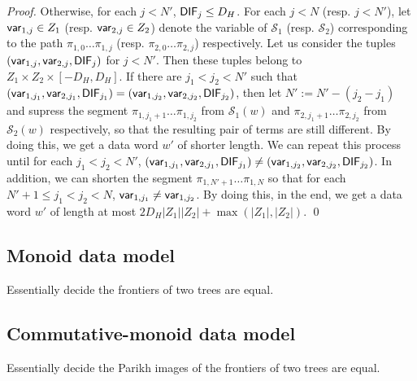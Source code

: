 \documentclass[runningheads,a4paper]{llncs}
\newcommand\Ss{\mathcal{S}}
\begin{document}
\begin{proof}
Otherwise, for each $j < N'$,  ${\sf DIF}_j \le D_H$. For each $j < N$ (resp. $j < N'$), let ${\sf var}_{1,j} \in Z_1$ (resp. ${\sf var}_{2,j} \in Z_2$) denote the variable of $\Ss_1$ (resp. $\Ss_2$) corresponding to the path $\pi_{1,0} \dots \pi_{1,j}$ (resp. $\pi_{2,0} \dots \pi_{2,j}$) respectively. Let us consider the tuples $({\sf var}_{1,j}, {\sf var}_{2,j}, {\sf DIF}_j)$ for $j < N'$. Then these tuples belong to $Z_1 \times Z_2 \times [-D_H, D_H]$. If there are $j_1 < j_2 < N'$ such that $({\sf var}_{1, j_1}, {\sf var}_{2, j_1}, {\sf DIF}_{j_1}) = ({\sf var}_{1, j_2}, {\sf var}_{2, j_2}, {\sf DIF}_{j_2})$, then let $N':= N' - (j_2 - j_1)$ and supress the segment $\pi_{1, j_1+1} \dots \pi_{1,j_2}$ from $\Ss_1(w)$ and   $\pi_{2, j_1+1} \dots \pi_{2,j_2}$ from $\Ss_2(w)$ respectively, so that the resulting pair of terms are still different. By doing this, we get a data word $w'$ of shorter length. We can repeat this process until for each $j_1 < j_2 < N'$, $({\sf var}_{1, j_1}, {\sf var}_{2, j_1}, {\sf DIF}_{j_1}) \neq ({\sf var}_{1, j_2}, {\sf var}_{2, j_2}, {\sf DIF}_{j_2})$. In addition, we can shorten the segment $\pi_{1,N'+1}\dots \pi_{1, N}$ so that for each $N'+1 \le j_1 < j_2 < N$, ${\sf var}_{1,j_1} \neq {\sf var}_{1, j_2}$. By doing this, in the end, we get a data word $w'$ of length at most $2D_H |Z_1|  |Z_2| + \max(|Z_1|, |Z_2|)$.
\qed
\end{proof}

\subsection{Monoid data model}

Essentially decide the frontiers of two trees are equal.

\subsection{Commutative-monoid data model}

Essentially decide the Parikh images of the frontiers of two trees are equal. 
\end{document}
